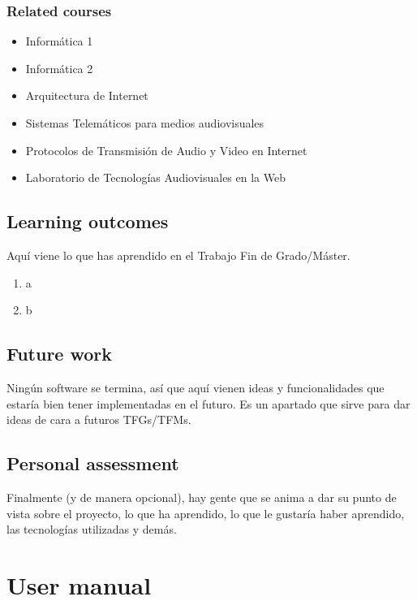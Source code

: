 \documentclass[a4paper, 12pt]{book}
\begin{document}
\subsection{Related courses}
\begin{itemize}
  \item Informática 1
  \item Informática 2
  \item Arquitectura de Internet
  \item Sistemas Telemáticos para medios audiovisuales
  \item Protocolos de Transmisión de Audio y Video en Internet
  \item Laboratorio de Tecnologías Audiovisuales en la Web
\end{itemize}
\section{Learning outcomes}
\label{sec:lecciones_aprendidas}
Aquí viene lo que has aprendido en el Trabajo Fin de Grado/Máster.
\begin{enumerate}
  \item a
  \item b
\end{enumerate}
\section{Future work}
\label{sec:trabajos_futuros}
Ningún software se termina, así que aquí vienen ideas y funcionalidades
que estaría bien tener implementadas en el futuro.
Es un apartado que sirve para dar ideas de cara a futuros TFGs/TFMs.
\section{Personal assessment}
\label{sec:valoracion}
Finalmente (y de manera opcional), hay gente que se anima a dar su punto de
vista sobre el proyecto, lo que ha aprendido, lo que le gustaría haber aprendido,
las tecnologías utilizadas y demás.
\cleardoublepage
\appendix
\chapter{User manual}
\label{app:manual}
\end{document}
